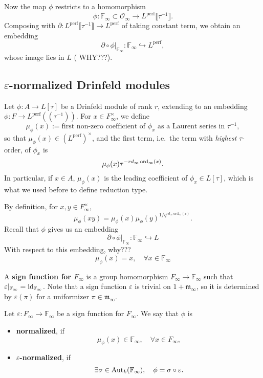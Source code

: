 \documentclass{article}
\newcommand{\F}{\mathbb{F}}
\newcommand{\perf}{\mathrm{perf}}
\renewcommand{\O}{\mathcal{O}}
\newcommand{\m}{\mathfrak{m}}
\begin{document}
Now the map $\phi$ restricts to a homomorphism
\[\phi : \F_\infty\subset\O_\infty\to L^\perf\llbracket \tau^{-1} \rrbracket.\]
Composing with $\partial : L^{\perf}\llbracket \tau^{-1} \rrbracket\to L^\perf$ of taking constant term,
we obtain an embedding \[\partial\circ\phi|_{\F_\infty} : \F_\infty\hookrightarrow L^\perf,\]
whose image lies in $L$ ({\color{red} WHY???}).


\subsection{\texorpdfstring{$\varepsilon$}{epsilon}-normalized Drinfeld modules}

Let $\phi : A\to L[\tau]$ be a Drinfeld module of rank $r$, extending to an embedding $\phi : F\to L^\perf((\tau^{-1}))$.
For $x\in F_\infty^\times$,
we define \[\mu_\phi(x) := \text{first non-zero coefficient of }\phi_x\text{ as a Laurent series in }\tau^{-1},\]
so that $\mu_\phi(x)\in (L^\perf)^\times$,
and the first term, i.e.\ the term with \textit{highest} $\tau$-order, of $\phi_x$ is
\[\mu_\phi(x)\tau^{-rd_\infty\operatorname{ord}_\infty(x)}.\]
In particular, if $x\in A$, $\mu_\phi(x)$ is the leading coefficient of $\phi_x\in L[\tau]$,
which is what we used before to define reduction type.


By definition, for $x, y\in F_\infty^\times$,
\[\mu_\phi(xy)=\mu_\phi(x)\mu_\phi(y)^{1/q^{rd_\infty\mathrm{~ord}_\infty(x)}}.\]
Recall that $\phi$ gives us an embedding
\[\partial\circ\phi|_{\F_\infty} : \F_\infty\hookrightarrow L\]
With respect to this embedding, {\color{red} why???}
\[\mu_\phi(x) = x, \quad\forall x\in\F_\infty\]
\begin{definition}
    A \textbf{sign function for $F_\infty$} is a
    group homomorphism $F_\infty\to\F_\infty$ such that $\varepsilon|_{\F_\infty} = \Id_{\F_\infty}$.
    Note that a sign function $\varepsilon$ is trivial on $1 + \m_\infty$,
    so it is determined by $\varepsilon(\pi)$ for a uniformizer $\pi\in\m_\infty$.

    Let $\varepsilon : F_\infty\to\F_\infty$ be a sign function for $F_\infty$. 
    We say that $\phi$ is \begin{itemize}
        \item \textbf{normalized}, if \[\mu_\phi(x)\in \F_\infty,\quad \forall x\in F_\infty,\]
        \item $\varepsilon$\textbf{-normalized},
        if \[\exists\sigma\in\aut_k(\F_\infty),\quad \phi = \sigma\circ\varepsilon.\]
    \end{itemize}
\end{definition}
\end{document}

